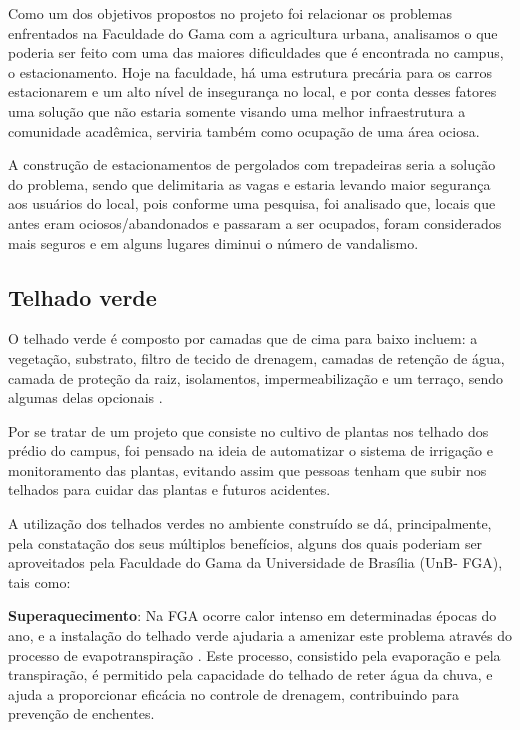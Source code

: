   Como um dos objetivos propostos no projeto foi relacionar os problemas enfrentados na Faculdade do Gama com a agricultura urbana,
  analisamos o que poderia ser feito com uma das maiores dificuldades que é encontrada no campus, o estacionamento. Hoje na faculdade,
  há uma estrutura precária para os carros estacionarem e um alto nível de insegurança no local, e por conta desses fatores uma solução
  que não estaria somente visando uma melhor infraestrutura a comunidade acadêmica, serviria também como ocupação de uma área ociosa.

  A construção de estacionamentos de pergolados com trepadeiras seria a solução do problema, sendo que delimitaria as vagas e estaria
  levando maior segurança aos usuários do local, pois conforme uma pesquisa, foi analisado que, locais que antes eram ociosos/abandonados
  e passaram a ser ocupados, foram considerados mais seguros e em alguns lugares diminui o número de vandalismo.

\subsection{Telhado verde}

  O telhado verde é composto por camadas que de cima para baixo incluem: a vegetação, substrato, filtro de tecido de drenagem, camadas de
  retenção de água, camada de proteção da raiz, isolamentos, impermeabilização e um terraço, sendo algumas delas opcionais \cite{nutricao11}.

  Por se tratar de um projeto  que consiste no cultivo de plantas nos telhado dos prédio do campus, foi pensado na ideia de automatizar o
  sistema de irrigação e monitoramento das plantas, evitando assim que pessoas tenham que subir nos telhados para cuidar das plantas e
  futuros acidentes.

  A utilização dos telhados verdes no ambiente construído se dá, principalmente, pela constatação dos seus múltiplos benefícios, alguns
  dos quais poderiam ser aproveitados pela Faculdade do Gama da Universidade de Brasília  (UnB- FGA), tais como:

\textbf{Superaquecimento}: Na FGA ocorre calor intenso em determinadas épocas do ano, e a instalação do telhado verde ajudaria a
  amenizar este problema através do processo de evapotranspiração \cite{nutricao11}. Este processo, consistido pela evaporação e pela transpiração, é
  permitido pela capacidade do telhado de reter água da chuva, e ajuda a proporcionar eficácia no controle de drenagem, contribuindo para
  prevenção de enchentes.

